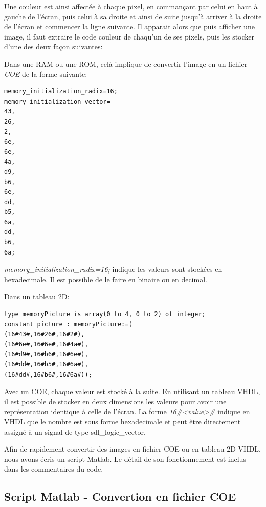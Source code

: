 \documentclass[french]{nakrule}
\begin{document}
Une couleur est ainsi affectée à chaque pixel, en commançant par celui en haut à
gauche de l'écran, puis celui à sa droite et ainsi de suite jusqu'à arriver à la
droite de l'écran et commencer la ligne suivante. Il apparait alors que puis
afficher une image, il faut extraire le code couleur de chaqu'un de ses pixels,
puis les stocker d'une des deux façon suivantes:\vspace{.1in}
\begin{items}
\item Dans une RAM ou une ROM, celà implique de convertir l'image en un fichier
  \emph{COE} de la forme suivante:
  \begin{lstlisting}[frame=single, basicstyle=\scriptsize, backgroundcolor=\color{backcolor}]
memory_initialization_radix=16;
memory_initialization_vector=
43,
26,
2,
6e,
6e,
4a,
d9,
b6,
6e,
dd,
b5,
6a,
dd,
b6,
6a;
\end{lstlisting}
\emph{memory\_initialization\_radix=16;} indique les valeurs sont stockées en
hexadecimale. Il est possible de le faire en binaire ou en decimal.
\item Dans un tableau 2D:
  \begin{lstlisting}[style=vhdl]
type memoryPicture is array(0 to 4, 0 to 2) of integer;
constant picture : memoryPicture:=(
(16#43#,16#26#,16#2#),
(16#6e#,16#6e#,16#4a#),
(16#d9#,16#b6#,16#6e#),
(16#dd#,16#b5#,16#6a#),
(16#dd#,16#b6#,16#6a#));
  \end{lstlisting}
\end{items}

Avec un COE, chaque valeur est stocké à la suite. En utilisant un tableau VHDL,
il est possible de stocker en deux dimensions les valeurs pour avoir une
représentation identique à celle de l'écran. La forme \emph{16\#<value>\#} indique
en VHDL que le nombre est sous forme hexadecimale et peut être directement
assigné à un signal de type sdl\_logic\_vector.

Afin de rapidement convertir des images en fichier COE ou en tableau 2D VHDL,
nous avons écris un script Matlab. Le détail de son fonctionnement est inclus
dans les commentaires du code.


\clearpage

\subsection{Script Matlab - Convertion en fichier COE}
\label{subsec:Script1}
\vspace{.1in}

\clearpage
\end{document}
